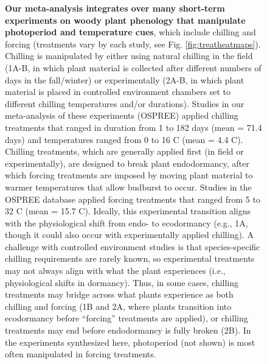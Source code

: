 \documentclass{article}
\newcommand{\R}[1]{\label{#1}\linelabel{#1}}
\begin{document}
\begin{figure}[h!]
\caption{\textbf{Our meta-analysis integrates over many \R{ee10}short-term experiments on woody plant phenology that manipulate photoperiod and temperature cues}, which include chilling and forcing (treatments vary by each study, see Fig. \ref{fig:treatheatmaps}). Chilling is manipulated by either using natural chilling in the field (1A-B, in which plant material is collected after different numbers of days in the fall/winter) or experimentally (2A-B, in which plant material is placed in controlled environment chambers set to different chilling temperatures and/or durations). Studies in our meta-analysis of these experiments (OSPREE) applied chilling treatments that ranged in duration from 1 to 182 days (mean = 71.4 days) and temperatures ranged from  0 to 16 \degree C (mean = 4.4 \degree C). Chilling treatments, which are generally applied first (in field or experimentally), are designed to break plant endodormancy, after which forcing treatments are imposed by moving plant material to warmer temperatures that allow budburst to occur. Studies in the OSPREE database applied forcing treatments that ranged from 5 to 32 \degree C (mean = 15.7 \degree C). Ideally, this experimental transition aligns with the physiological shift from endo- to ecodormancy (e.g., 1A, though it could also occur with experimentally applied chilling). A challenge with controlled environment studies is that species-specific chilling requirements are rarely known, so experimental treatments may not always align with what the plant experiences (i.e., physiological shifts in dormancy). Thus, in some cases, chilling treatments may bridge across what plants experience as both chilling and forcing (1B and 2A, where plants transition into ecodormancy before ``forcing'' treatments are applied), or chilling treatments may end before endodormancy is fully broken (2B). In the \R{ee11}experiments synthesized here, photoperiod (not shown) is most often manipulated in forcing treatments.}
\label{fig:concept}  
\end{figure}
\end{document}
